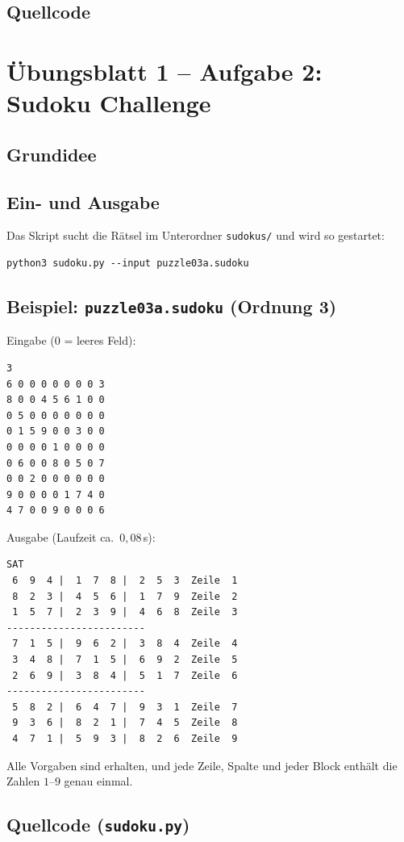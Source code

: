 \documentclass[11pt, a4paper]{article}
\begin{document}
\subsection*{Quellcode}




\newpage
\section*{Übungsblatt 1 -- Aufgabe 2: Sudoku Challenge}

\subsection*{Grundidee}

\subsection*{Ein- und Ausgabe}

Das Skript sucht die Rätsel im Unterordner \texttt{sudokus/} und wird so gestartet:
\begin{lstlisting}[language={}, numbers=none]
python3 sudoku.py --input puzzle03a.sudoku
\end{lstlisting}

\subsection*{Beispiel: \texttt{puzzle03a.sudoku} (Ordnung 3)}

\begin{minipage}[t]{0.42\textwidth}
Eingabe ($0$ = leeres Feld):
\begin{lstlisting}[language={}, numbers=none]
3
6 0 0 0 0 0 0 0 3
8 0 0 4 5 6 1 0 0
0 5 0 0 0 0 0 0 0
0 1 5 9 0 0 3 0 0
0 0 0 0 1 0 0 0 0
0 6 0 0 8 0 5 0 7
0 0 2 0 0 0 0 0 0
9 0 0 0 0 1 7 4 0
4 7 0 0 9 0 0 0 6
\end{lstlisting}
\end{minipage}\hfill
\begin{minipage}[t]{0.54\textwidth}
Ausgabe (Laufzeit ca.\ $0{,}08$\,s):
\begin{lstlisting}[language={}, numbers=none]
SAT
 6  9  4 |  1  7  8 |  2  5  3  Zeile  1
 8  2  3 |  4  5  6 |  1  7  9  Zeile  2
 1  5  7 |  2  3  9 |  4  6  8  Zeile  3
------------------------
 7  1  5 |  9  6  2 |  3  8  4  Zeile  4
 3  4  8 |  7  1  5 |  6  9  2  Zeile  5
 2  6  9 |  3  8  4 |  5  1  7  Zeile  6
------------------------
 5  8  2 |  6  4  7 |  9  3  1  Zeile  7
 9  3  6 |  8  2  1 |  7  4  5  Zeile  8
 4  7  1 |  5  9  3 |  8  2  6  Zeile  9
\end{lstlisting}
\end{minipage}

Alle Vorgaben sind erhalten, und jede Zeile, Spalte und jeder Block enthält die Zahlen $1$--$9$ genau einmal.

\subsection*{Quellcode (\texttt{sudoku.py})}


\end{document}
